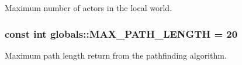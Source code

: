 Maximum number of actors in the local world. 

\hypertarget{namespaceglobals_ad06f2af5cf1c7c3b13ea34b6f0903af0}{
\subsubsection[{M\-A\-X\-\_\-\-P\-A\-T\-H\-\_\-\-L\-E\-N\-G\-T\-H}]{\setlength{\rightskip}{0pt plus 5cm}const int globals\-::\-M\-A\-X\-\_\-\-P\-A\-T\-H\-\_\-\-L\-E\-N\-G\-T\-H = 20}}\label{namespaceglobals_ad06f2af5cf1c7c3b13ea34b6f0903af0}


Maximum path length return from the pathfinding algorithm. 

